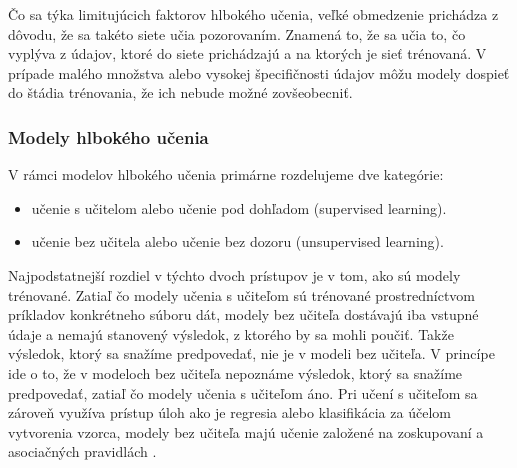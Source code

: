Čo sa týka limitujúcich faktorov hlbokého učenia, veľké obmedzenie prichádza z dôvodu, že sa takéto siete učia pozorovaním. Znamená to, že sa učia to, čo vyplýva z údajov, ktoré do siete prichádzajú a na ktorých je sieť trénovaná. V prípade malého množstva alebo vysokej špecifičnosti údajov môžu modely dospieť do štádia trénovania, že ich nebude možné zovšeobecniť.


\subsubsection{Modely hlbokého učenia}
V rámci modelov hlbokého učenia primárne rozdelujeme dve kategórie:
\begin{itemize}
  \item učenie s učitelom alebo učenie pod dohľadom (supervised learning).
  \item učenie bez učitela alebo učenie bez dozoru (unsupervised learning).
\end{itemize}



Najpodstatnejší rozdiel v týchto dvoch prístupov je v tom, ako sú modely trénované. Zatiaľ čo modely učenia s učiteľom sú trénované prostredníctvom príkladov konkrétneho súboru dát, modely bez učiteľa dostávajú iba vstupné údaje a nemajú stanovený výsledok, z ktorého by sa mohli poučiť. Takže výsledok, ktorý sa snažíme predpovedať, nie je v modeli bez učiteľa. V princípe ide o to, že v modeloch bez učiteľa nepoznáme výsledok, ktorý sa snažíme predpovedať, zatiaľ čo modely učenia s učiteľom áno. Pri učení s učiteľom sa zároveň využíva prístup úloh ako je regresia alebo klasifikácia za účelom vytvorenia vzorca, modely bez učiteľa majú učenie založené na zoskupovaní a asociačných pravidlách \cite{deep_learning1}.

